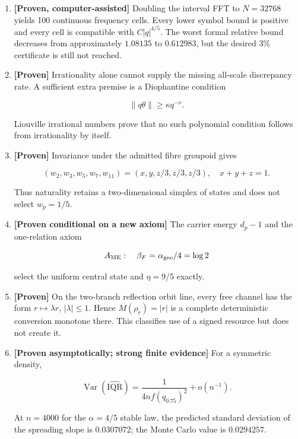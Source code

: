 \documentclass[11pt,a4paper,openany]{report}
\newcommand{\statusProven}{\textcolor{fingreen}{[Proven]}}
\newcommand{\statusComputer}{\textcolor{fingreen}{[Proven, computer-assisted]}}
\begin{document}
\begin{enumerate}
\item 
\textbf{\statusComputer{}} Doubling the interval FFT to \(N=32768\) yields 100 continuous frequency cells. Every lower symbol bound is positive and every cell is compatible with \(C|q|^{4/5}\). The worst formal relative bound decreases from approximately \(1.08135\) to \(0.612983\), but the desired \(3\%\) certificate is still not reached.

\item 
\textbf{\statusProven{}} Irrationality alone cannot supply the missing all-scale discrepancy rate. A sufficient extra premise is a Diophantine condition

\[
\|q\theta\|\ge\kappa q^{-\nu}.
\]

Liouville irrational numbers prove that no such polynomial condition follows from irrationality by itself.

\item 
\textbf{\statusProven{}} Invariance under the admitted fibre groupoid gives

\[
(w_2,w_3,w_5,w_7,w_{11})
   =(x,y,z/3,z/3,z/3),\quad x+y+z=1.
\]

Thus naturality retains a two-dimensional simplex of states and does not select \(w_p=1/5\).

\item 
\textbf{[Proven conditional on a new axiom]} The carrier energy \(d_p-1\) and the one-relation axiom

\[
A_{\rm ME}:\quad \beta_F=\alpha_{\rm geo}/4=\log2
\]

select the uniform central state and \(\eta=9/5\) exactly.

\item 
\textbf{\statusProven{}} On the two-branch reflection orbit line, every free channel has the form \(r\mapsto\lambda r\), \(|\lambda|\le1\). Hence \(M(\rho_r)=|r|\) is a complete deterministic conversion monotone there. This classifies use of a signed resource but does not create it.

\item 
\textbf{[Proven asymptotically; strong finite evidence]} For a symmetric density,

\[
\operatorname{Var}(\widehat{\mathrm{IQR}})
   =
   \frac{1}{4n f(q_{0.75})^2}+o(n^{-1}).
\]

At \(n=4000\) for the \(\alpha=4/5\) stable law, the predicted standard deviation of the spreading slope is \(0.0307072\); the Monte Carlo value is \(0.0294257\).


\end{enumerate}
\end{document}
